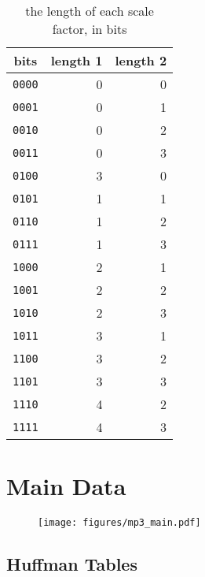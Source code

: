 \documentclass[letter]{scrbook}
\begin{document}
\begin{table}[h]
\begin{tabular}{|c|r|r|}
\hline
bits & length 1 & length 2 \\
\hline
\texttt{0000} & 0 & 0 \\
\texttt{0001} & 0 & 1 \\
\texttt{0010} & 0 & 2 \\
\texttt{0011} & 0 & 3 \\
\texttt{0100} & 3 & 0 \\
\texttt{0101} & 1 & 1 \\
\texttt{0110} & 1 & 2 \\
\texttt{0111} & 1 & 3 \\
\texttt{1000} & 2 & 1 \\
\texttt{1001} & 2 & 2 \\
\texttt{1010} & 2 & 3 \\
\texttt{1011} & 3 & 1 \\
\texttt{1100} & 3 & 2 \\
\texttt{1101} & 3 & 3 \\
\texttt{1110} & 4 & 2 \\
\texttt{1111} & 4 & 3 \\
\hline
\end{tabular}
\caption{the length of each scale factor, in bits}
\end{table}

\section{Main Data}

\begin{figure}[h]
\texttt{[image: figures/mp3\_main.pdf]}
\end{figure}

\clearpage

\subsection{Huffman Tables}
\end{document}
